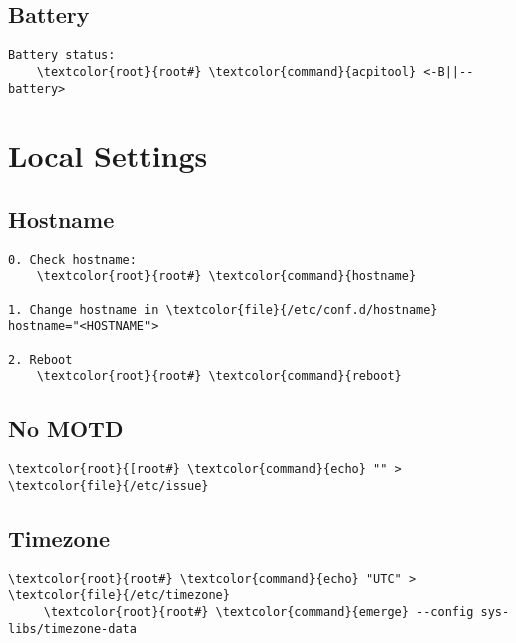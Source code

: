 \documentclass[10pt, a4paper, onecolumn, openany]{book}         %
\begin{document}
\section{Battery}
\begin{Verbatim}[commandchars=\\\{\}]
Battery status:
    \textcolor{root}{root#} \textcolor{command}{acpitool} <-B||--battery>
\end{Verbatim}



\chapter{Local Settings}
\section{Hostname}
\begin{Verbatim}[commandchars=\\\{\}]
0. Check hostname:
    \textcolor{root}{root#} \textcolor{command}{hostname}
    
1. Change hostname in \textcolor{file}{/etc/conf.d/hostname}
hostname="<HOSTNAME">

2. Reboot
    \textcolor{root}{root#} \textcolor{command}{reboot}
\end{Verbatim}

\section{No MOTD}
\begin{Verbatim}[commandchars=\\\{\}]
    \textcolor{root}{[root#} \textcolor{command}{echo} "" > \textcolor{file}{/etc/issue}
\end{Verbatim}



\section{Timezone}
\begin{Verbatim}[commandchars=\\\{\}]
     \textcolor{root}{root#} \textcolor{command}{echo} "UTC" > \textcolor{file}{/etc/timezone}
     \textcolor{root}{root#} \textcolor{command}{emerge} --config sys-libs/timezone-data
\end{Verbatim}
\end{document}
